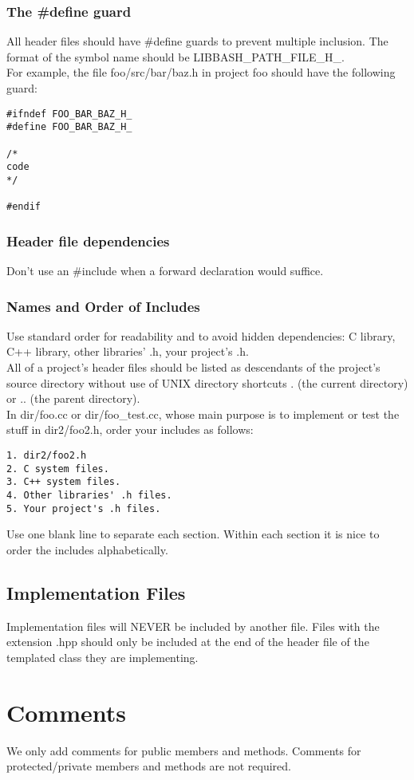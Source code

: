 \documentclass[letterpaper,10pt]{article}
\begin{document}
\subsubsection{The \#define guard}
All header files should have \#define guards to prevent multiple inclusion. The format of the symbol name should be LIBBASH\_PATH\_FILE\_H\_.\\
For example, the file foo/src/bar/baz.h in project foo should have the following guard:
\begin{verbatim}
#ifndef FOO_BAR_BAZ_H_
#define FOO_BAR_BAZ_H_

/*
code
*/

#endif
\end{verbatim}
\subsubsection{Header file dependencies}
Don't use an \#include when a forward declaration would suffice.\\
\subsubsection{Names and Order of Includes}
Use standard order for readability and to avoid hidden dependencies: C library, C++ library, other libraries' .h, your project's .h.\\
All of a project's header files should be listed as descendants of the project's source directory without use of UNIX directory shortcuts . (the current directory) or .. (the parent directory).\\
In dir/foo.cc or dir/foo\_test.cc, whose main purpose is to implement or test the stuff in dir2/foo2.h, order your includes as follows:
\begin{verbatim}
1. dir2/foo2.h
2. C system files.
3. C++ system files.
4. Other libraries' .h files.
5. Your project's .h files.
\end{verbatim}
Use one blank line to separate each section. Within each section it is nice to order the includes alphabetically.
\subsection{Implementation Files}
Implementation files will NEVER be included by another file.  Files with the extension .hpp should only be included at the end of the header file of the templated class they are implementing.
\section{Comments}
We only add comments for public members and methods. Comments for protected/private members and methods are not required.
\end{document}
